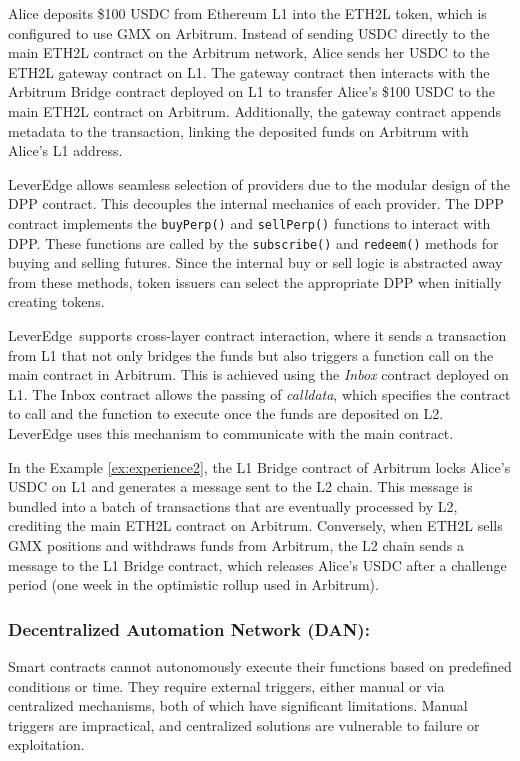 \begin{example}\label{ex:experience2}
	Alice deposits \$100 USDC from Ethereum L1 into the ETH2L token, which is configured to use GMX on Arbitrum. Instead of sending USDC directly to the main ETH2L contract on the Arbitrum network, Alice sends her USDC to the ETH2L gateway contract on L1. The gateway contract then interacts with the Arbitrum Bridge contract deployed on L1 to transfer Alice's \$100 USDC to the main ETH2L contract on Arbitrum. Additionally, the gateway contract appends metadata to the transaction, linking the deposited funds on Arbitrum with Alice's L1 address.
\end{example}

LeverEdge allows seamless selection of providers due to the modular design of the DPP contract. This decouples the internal mechanics of each provider. The DPP contract implements the \texttt{buyPerp()} and \texttt{sellPerp()} functions to interact with DPP. These functions are called by the \texttt{subscribe()} and \texttt{redeem()} methods for buying and selling futures. Since the internal buy or sell logic is abstracted away from these methods, token issuers can select the appropriate DPP when initially creating tokens.

LeverEdge\ supports cross-layer contract interaction, where it sends a transaction from L1 that not only bridges the funds but also triggers a function call on the main contract in Arbitrum. This is achieved using the \textit{Inbox} contract deployed on L1. The Inbox contract allows the passing of \textit{calldata}, which specifies the contract to call and the function to execute once the funds are deposited on L2. LeverEdge uses this mechanism to communicate with the main contract.

\begin{example}
	In the Example \ref{ex:experience2}, the L1 Bridge contract of Arbitrum locks Alice's USDC on L1 and generates a message sent to the L2 chain. This message is bundled into a batch of transactions that are eventually processed by L2, crediting the main ETH2L contract on Arbitrum. Conversely, when ETH2L sells GMX positions and withdraws funds from Arbitrum, the L2 chain sends a message to the L1 Bridge contract, which releases Alice's USDC after a challenge period (\ie one week in the optimistic rollup used in Arbitrum).
\end{example}

\subsubsection{Decentralized Automation Network (DAN):} Smart contracts cannot autonomously execute their functions based on predefined conditions or time. They require external triggers, either manual or via centralized mechanisms, both of which have significant limitations. Manual triggers are impractical, and centralized solutions are vulnerable to failure or exploitation. 

